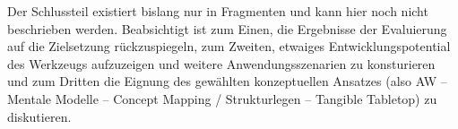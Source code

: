 \todo Der Schlussteil existiert bislang nur in Fragmenten und kann hier noch nicht beschrieben werden. Beabsichtigt ist zum Einen, die Ergebnisse der Evaluierung auf die Zielsetzung rückzuspiegeln, zum Zweiten, etwaiges Entwicklungspotential des Werkzeugs aufzuzeigen und weitere Anwendungsszenarien zu konsturieren und zum Dritten die Eignung des gewählten konzeptuellen Ansatzes (also AW -- Mentale Modelle -- Concept Mapping / Strukturlegen -- Tangible Tabletop) zu diskutieren.

